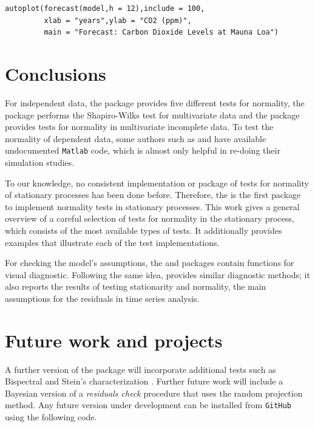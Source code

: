\begin{verbatim}
autoplot(forecast(model,h = 12),include = 100,
         xlab = "years",ylab = "CO2 (ppm)",
         main = "Forecast: Carbon Dioxide Levels at Mauna Loa")
\end{verbatim}



\section{Conclusions}\label{conclusions}

For independent data, the  package \citep{nortest2015} provides five different tests for normality, the  package \citep{mvnormtest2012} performs the Shapiro-Wilks test for multivariate data and the  package \citep{Mortaza2014} provides tests for normality in multivariate incomplete data. To test the normality of dependent data, some authors such as \citet{vavra2017} and \citet{nietoreyes2014} have available undocumented \texttt{Matlab} code, which is almost only helpful in re-doing their simulation studies.

To our knowledge, no consistent implementation or package of tests for normality of stationary processes has been done before. Therefore, the  is the first package to implement normality tests in stationary processes. This work gives a general overview of a careful selection of tests for normality in the stationary process, which consists of the most available types of tests. It additionally provides examples that illustrate each of the test implementations.

For checking the model's assumptions, the  and  packages contain functions for visual diagnostic. Following the same idea,  provides similar diagnostic methods; it also reports the results of testing stationarity and normality, the main assumptions for the residuals in time series analysis.

\section{Future work and projects}\label{future-work-and-projects}

A further version of the  package will incorporate additional tests such as Bispectral \citep{Hinich1982} and Stein's characterization \citep{Meddahi2005}. Further future work will include a Bayesian version of a \emph{residuals check} procedure that uses the random projection method. Any future version under development can be installed from \texttt{GitHub} using the following code.

